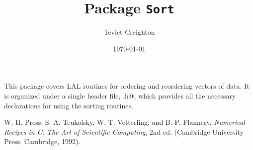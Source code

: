 \documentclass{article}
\begin{document}
\title{Package \texttt{Sort}}
\author{Teviet Creighton}
\date{\today}
\maketitle

This package covers LAL routines for ordering and reordering vectors
of data.  It is organized under a single header file, \verb@sort.h@,
which provides all the necessary declarations for using the sorting
routines.


\begin{thebibliography}{0}
  W. H. Press, S. A. Teukolsky, W. T. Vetterling, and B. P. Flannery,
  \textit{Numerical Recipes in C: The Art of Scientific Computing}, 2nd ed.
  (Cambridge University Press, Cambridge, 1992).
\end{thebibliography}
\end{document}
